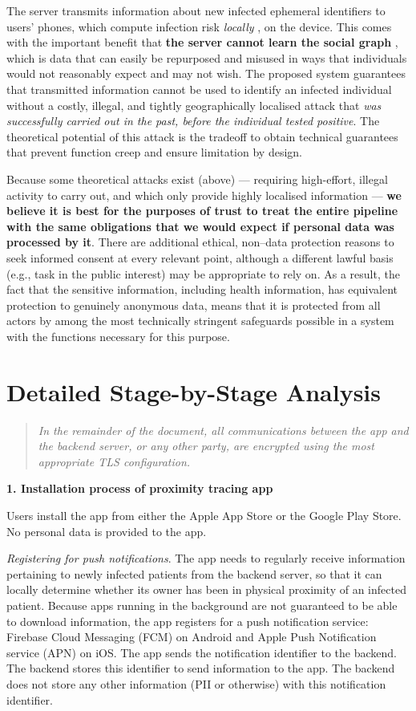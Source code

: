 \documentclass[12pt,a4paper]{article}
\begin{document}
The server transmits information about new infected ephemeral identifiers to users’ phones, which compute infection risk \textit{locally} , on the device. This comes with the important benefit that \textbf{the server cannot learn the social graph} , which is data that can easily be repurposed and misused in ways that individuals would not reasonably expect and may not wish. The proposed system guarantees that transmitted information cannot be used to identify an infected individual without a costly, illegal, and tightly geographically localised attack that \textit{was successfully carried out in the past, before the individual tested positive}. The theoretical potential of this attack is the tradeoff to obtain technical guarantees that prevent function creep and ensure limitation by design.


Because some theoretical attacks exist (above) — requiring high-effort, illegal activity to
carry out, and which only provide highly localised information — \textbf{we believe it is best for the purposes of trust to treat the entire pipeline with the same obligations that we would expect if personal data was processed by it}. There are additional ethical, non–data protection reasons to seek informed consent at every relevant point, although a
different lawful basis (e.g., task in the public interest) may be appropriate to rely on. As a result, the fact that the sensitive information, including health information, has equivalent protection to genuinely anonymous data, means that it is protected from all actors by among the most technically stringent safeguards possible in a system with the functions necessary for this purpose.
\clearpage
\section*{Detailed Stage-by-Stage Analysis}
\begin{quote}
\textit{In the remainder of the document, all communications between the app and the backend server, or any other party, are encrypted using the most appropriate TLS configuration.}
\end{quote}
\textbf{1. Installation process of proximity tracing app}


Users install the app from either the Apple App Store or the Google Play Store. No personal data is provided to the app.


\textit{Registering for push notifications}. The app needs to regularly receive information pertaining to newly infected patients from the backend server, so that it can locally determine whether its owner has been in physical proximity of an infected patient. Because apps running in the background are not guaranteed to be able to download information, the app registers for a push notification service: Firebase Cloud Messaging (FCM) on Android and Apple Push Notification service (APN) on iOS. The app sends the notification identifier to the backend. The backend stores this identifier to send information to the app. The backend does not store any other information (PII or otherwise) with this notification identifier.
\end{document}
